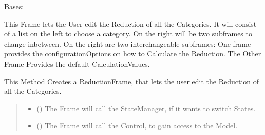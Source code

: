 \documentclass[letterpaper,10pt,english]{sphinxmanual}
\begin{document}
\begin{fulllineitems}
\label{\detokenize{apidoc/src.osm_configurator.view.toplevelframes:src.osm_configurator.view.toplevelframes.reduction_frame.ReductionFrame}}
\pysigstartsignatures
{}
\pysigstopsignatures
\sphinxAtStartPar
Bases: {\hyperref[\detokenize{apidoc/src.osm_configurator.view.toplevelframes:src.osm_configurator.view.toplevelframes.top_level_frame.TopLevelFrame}]{}}

\sphinxAtStartPar
This Frame lets the User edit the Reduction of all the Categories.
It will consist of a list on the left to choose a category.
On the right will be two sub\sphinxhyphen{}frames to change
inbetween.
On the right are two interchangeable sub\sphinxhyphen{}frames: One frame provides the configuration\sphinxhyphen{}Options on how to
Calculate the Reduction. The Other Frame Provides the default Calculation\sphinxhyphen{}Values.

\begin{fulllineitems}
\label{\detokenize{apidoc/src.osm_configurator.view.toplevelframes:src.osm_configurator.view.toplevelframes.reduction_frame.ReductionFrame.__init__}}
\pysigstartsignatures
{}
\pysigstopsignatures
\sphinxAtStartPar
This Method Creates a ReductionFrame, that lets the user edit the Reduction of all the Categories.
\begin{quote}\begin{description}
\begin{itemize}
\item {} 
\sphinxAtStartPar
{} ({\hyperref[\detokenize{apidoc/src.osm_configurator.view.states:src.osm_configurator.view.states.state_manager.StateManager}]{}}) \textendash{} The Frame will call the StateManager, if it wants to switch States.

\item {} 
\sphinxAtStartPar
{} ({\hyperref[\detokenize{apidoc/src.osm_configurator.control:src.osm_configurator.control.control_interface.IControl}]{}}) \textendash{} The Frame will call the Control, to gain access to the Model.

\end{itemize}

\end{description}\end{quote}

\end{fulllineitems}


\end{fulllineitems}
\end{document}
